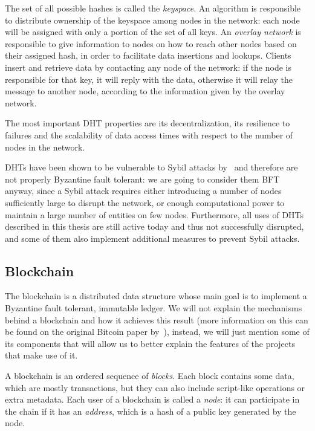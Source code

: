 \documentclass[mscthesis]{usiinfthesis}
\begin{document}
The set of all possible hashes is called the \emph{keyspace}. An algorithm is responsible to distribute ownership of the keyspace among nodes in the network: each node will be assigned with only a portion of the set of all keys. An \emph{overlay network} is responsible to give information to nodes on how to reach other nodes based on their assigned hash, in order to facilitate data insertions and lookups. Clients insert and retrieve data by contacting any node of the network: if the node is responsible for that key, it will reply with the data, otherwise it will relay the message to another node, according to the information given by the overlay network.

The most important DHT properties are its decentralization, its resilience to failures and the scalability of data access times with respect to the number of nodes in the network.

DHTs have been shown to be vulnerable to Sybil attacks by~\cite{wang2012real} and therefore are not properly Byzantine fault tolerant: we are going to consider them BFT anyway, since a Sybil attack requires either introducing a number of nodes sufficiently large to disrupt the network, or enough computational power to maintain a large number of entities on few nodes. Furthermore, all uses of DHTs described in this thesis are still active today and thus not successfully disrupted, and some of them also implement additional measures to prevent Sybil attacks.

\subsection{Blockchain}\label{tech:blockchain}

The blockchain is a distributed data structure whose main goal is to implement a Byzantine fault tolerant, immutable ledger.
We will not explain the mechanisms behind a blockchain and how it achieves this result (more information on this can be found on the original Bitcoin paper by~\cite{bitcoin}),
instead, we will just mention some of its components that will allow us to better explain the features of the projects that make use of it.

A blockchain is an ordered sequence of \emph{blocks}. Each block contains some data, which are mostly transactions, but they can also include script-like operations or extra metadata. Each user of a blockchain is called a \emph{node}: it can participate in the chain if it has an \emph{address}, which is a hash of a public key generated by the node.
\end{document}
